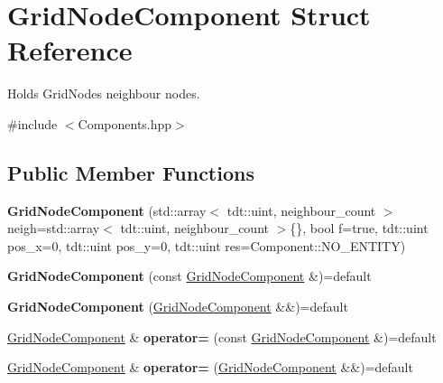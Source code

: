 \hypertarget{struct_grid_node_component}{}\section{Grid\+Node\+Component Struct Reference}
\label{struct_grid_node_component}


Holds Grid\+Node\textquotesingle{}s neighbour nodes.  




{\ttfamily \#include $<$Components.\+hpp$>$}

\subsection*{Public Member Functions}
\begin{DoxyCompactItemize}
\item 
{\bfseries Grid\+Node\+Component} (std\+::array$<$ tdt\+::uint, neighbour\+\_\+count $>$ neigh=std\+::array$<$ tdt\+::uint, neighbour\+\_\+count $>$\{\}, bool f=true, tdt\+::uint pos\+\_\+x=0, tdt\+::uint pos\+\_\+y=0, tdt\+::uint res=Component\+::\+N\+O\+\_\+\+E\+N\+T\+I\+TY)\hypertarget{struct_grid_node_component_a2e0f1759a1a055ea674c8f2a6c874480}{}\label{struct_grid_node_component_a2e0f1759a1a055ea674c8f2a6c874480}

\item 
{\bfseries Grid\+Node\+Component} (const \hyperlink{struct_grid_node_component}{Grid\+Node\+Component} \&)=default\hypertarget{struct_grid_node_component_adf2d250f042101cde2209a1b88ff529d}{}\label{struct_grid_node_component_adf2d250f042101cde2209a1b88ff529d}

\item 
{\bfseries Grid\+Node\+Component} (\hyperlink{struct_grid_node_component}{Grid\+Node\+Component} \&\&)=default\hypertarget{struct_grid_node_component_ada93f8b8295e5e0e4cf8844c3153f42e}{}\label{struct_grid_node_component_ada93f8b8295e5e0e4cf8844c3153f42e}

\item 
\hyperlink{struct_grid_node_component}{Grid\+Node\+Component} \& {\bfseries operator=} (const \hyperlink{struct_grid_node_component}{Grid\+Node\+Component} \&)=default\hypertarget{struct_grid_node_component_a42242f6773bf9621a49791ae425edfae}{}\label{struct_grid_node_component_a42242f6773bf9621a49791ae425edfae}

\item 
\hyperlink{struct_grid_node_component}{Grid\+Node\+Component} \& {\bfseries operator=} (\hyperlink{struct_grid_node_component}{Grid\+Node\+Component} \&\&)=default\hypertarget{struct_grid_node_component_a8dd20b5640bbadf4c70a2c58488284c1}{}\label{struct_grid_node_component_a8dd20b5640bbadf4c70a2c58488284c1}

\end{DoxyCompactItemize}
